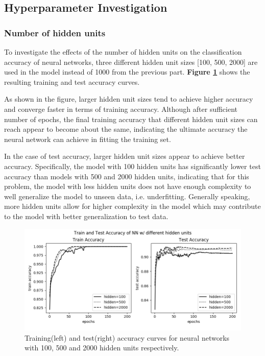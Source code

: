 \documentclass[12pt]{article}
\begin{document}
\bigskip
\subsection{Hyperparameter Investigation}
\subsubsection{Number of hidden units}

To investigate the effects of the number of hidden units on the classification accuracy of neural networks, three different hidden unit sizes [100, 500, 2000] are used in the model instead of 1000 from the previous part. \textbf{Figure \ref{fig:1-4}} shows the resulting training and test accuracy curves.

As shown in the figure, larger hidden unit sizes tend to achieve higher accuracy and converge faster in terms of training accuracy. Although after sufficient number of epochs, the final training accuracy that different hidden unit sizes can reach appear to become about the same, indicating the ultimate accuracy the neural network can achieve in fitting the training set. 

In the case of test accuracy, larger hidden unit sizes appear to achieve better accuracy. Specifically, the model with 100 hidden units has significantly lower test accuracy than models with 500 and 2000 hidden units, indicating that for this problem, the model with less hidden units does not have enough complexity to well generalize the model to unseen data, i.e. underfitting.
Generally speaking, more hidden units allow for higher complexity in the model which may contribute to the model with better generalization to test data. 

\begin{figure}[!htb]
\hspace*{-2cm}
\includegraphics[width=1.2\linewidth]{images/a2/1.4/accuracy.png}
\caption{Training(left) and test(right) accuracy curves for neural networks with 100, 500 and 2000 hidden units respectively.}\label{fig:1-4}
\end{figure}
\end{document}
